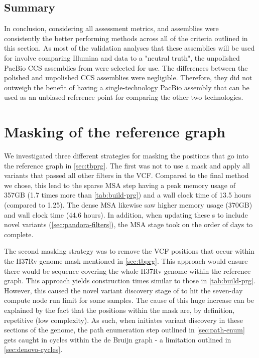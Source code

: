 \subsection{Summary}

In conclusion, considering all assessment metrics,  and  assemblies were consistently the better performing methods across all of the criteria outlined in this section. As most of the validation analyses that these assemblies will be used for involve comparing Illumina and \ont{} data to a "neutral truth", the unpolished PacBio CCS assemblies from  were selected for use. The differences between the polished and unpolished CCS assemblies were negligible. Therefore, they did not outweigh the benefit of having a single-technology PacBio assembly that can be used as an unbiased reference point for comparing the other two technologies.


\section{Masking of the \mtb{} reference graph}
\label{app:mask}

We investigated three different strategies for masking the positions that go into the \mtb{} reference graph in \autoref{sec:tbprg}. The first was not to use a mask and apply all variants that passed all other filters in the \cryptic{} VCF. Compared to the final method we chose, this lead to the sparse \prg{} MSA step having a peak memory usage of 357GB (1.7 times more than \autoref{tab:build-prg}) and a wall clock time of 13.5 hours (compared to 1.25). The dense \prg{} MSA likewise saw higher memory usage (370GB) and wall clock time (44.6 hours). In addition, when updating these \prg{}s to include novel variants (\autoref{sec:pandora-filters}), the MSA stage took on the order of days to complete.

The second masking strategy was to remove the VCF positions that occur within the H37Rv genome mask mentioned in \autoref{sec:tbprg}. This approach would ensure there would be sequence covering the whole H37Rv genome within the reference graph. This approach yields construction times similar to those in \autoref{tab:build-prg}. However, this caused the novel variant discovery stage of \pandora{} to hit the seven-day compute node run limit for some samples. The cause of this huge increase can be explained by the fact that the positions within the mask are, by definition, repetitive (low complexity). As such, when \pandora{} initiates \denovo{} variant discovery in these sections of the genome, the path enumeration step outlined in \autoref{sec:path-enum} gets caught in cycles within the de Bruijn graph - a limitation outlined in \autoref{sec:denovo-cycles}.

